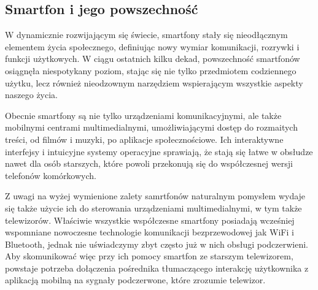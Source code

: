 \documentclass[12pt,twoside]{article}
\begin{document}
\subsection{Smartfon i jego powszechność}
{W dynamicznie rozwijającym się świecie, smartfony stały się nieodłącznym elementem życia społecznego, 
definiując nowy wymiar komunikacji, rozrywki i funkcji użytkowych. 
W ciągu ostatnich kilku dekad, powszechność smartfonów osiągnęła niespotykany poziom, 
stając się nie tylko przedmiotem codziennego użytku, lecz również nieodzownym 
narzędziem wspierającym wszystkie aspekty naszego życia.

Obecnie smartfony są nie tylko urządzeniami komunikacyjnymi, ale także mobilnymi centrami multimedialnymi,
 umożliwiającymi dostęp do rozmaitych treści, od filmów i muzyki, po aplikacje społecznościowe. 
 Ich interaktywne interfejsy i intuicyjne systemy operacyjne sprawiają, że stają się łatwe w obsłudze nawet dla osób starszych, 
 które powoli przekonują się do współczesnej wersji telefonów komórkowych.

 Z uwagi na wyżej wymienione zalety samrtfonów naturalnym pomysłem wydaje się także użycie ich do 
 sterowania urządzeniami multimedialnymi, w tym także telewizorów. Właściwie wszystkie współczesne smartfony posiadają 
 wcześniej wspomniane nowoczesne technologie komunikacji bezprzewodowej jak WiFi i Bluetooth, jednak nie uświadczymy
 zbyt często już w nich obsługi podczerwieni. Aby skomunikować więc przy ich pomocy smartfon
 ze starszym telewizorem, powstaje potrzeba dołączenia pośrednika tłumaczącego interakcję 
 użytkownika z aplikacją mobilną na sygnały podczerwone, które zrozumie telewizor.}
\end{document}
